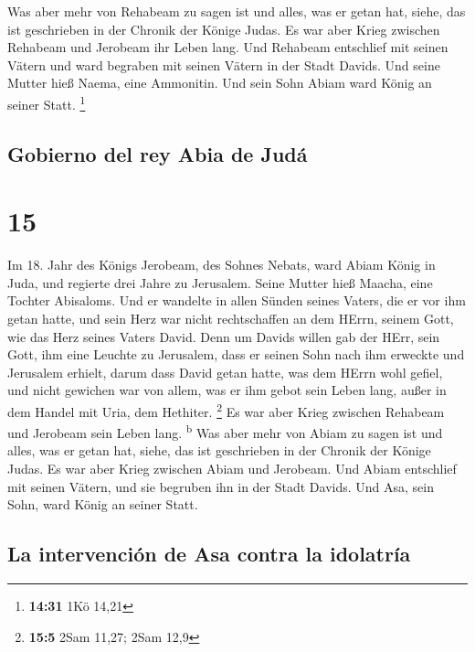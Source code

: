  Was aber mehr von Rehabeam zu sagen ist und alles, was
er getan hat, siehe, das ist geschrieben in der Chronik der Könige
Judas.  Es war aber Krieg zwischen Rehabeam und Jerobeam
ihr Leben lang.  Und Rehabeam entschlief mit seinen
Vätern und ward begraben mit seinen Vätern in der Stadt Davids. Und
seine Mutter hieß Naema, eine Ammonitin. Und sein Sohn Abiam ward König
an seiner Statt. \footnote{\textbf{14:31} 1Kö 14,21}

\hypertarget{gobierno-del-rey-abia-de-juduxe1}{%
\subsection{Gobierno del rey Abia de
Judá}\label{gobierno-del-rey-abia-de-juduxe1}}

\hypertarget{section-14}{%
\section{15}\label{section-14}}

 Im 18. Jahr des Königs Jerobeam, des Sohnes Nebats, ward
Abiam König in Juda,  und regierte drei Jahre zu
Jerusalem. Seine Mutter hieß Maacha, eine Tochter Abisaloms.
 Und er wandelte in allen Sünden seines Vaters, die er vor
ihm getan hatte, und sein Herz war nicht rechtschaffen an dem HErrn,
seinem Gott, wie das Herz seines Vaters David.  Denn um
Davids willen gab der HErr, sein Gott, ihm eine Leuchte zu Jerusalem,
dass er seinen Sohn nach ihm erweckte und Jerusalem erhielt,
 darum dass David getan hatte, was dem HErrn wohl gefiel,
und nicht gewichen war von allem, was er ihm gebot sein Leben lang,
außer in dem Handel mit Uria, dem Hethiter. \footnote{\textbf{15:5} 2Sam
  11,27; 2Sam 12,9}  Es war aber Krieg zwischen Rehabeam
und Jerobeam sein Leben lang. \textsuperscript{b}  Was
aber mehr von Abiam zu sagen ist und alles, was er getan hat, siehe, das
ist geschrieben in der Chronik der Könige Judas. Es war aber Krieg
zwischen Abiam und Jerobeam.  Und Abiam entschlief mit
seinen Vätern, und sie begruben ihn in der Stadt Davids. Und Asa, sein
Sohn, ward König an seiner Statt.

\hypertarget{la-intervenciuxf3n-de-asa-contra-la-idolatruxeda}{%
\subsection{La intervención de Asa contra la
idolatría}\label{la-intervenciuxf3n-de-asa-contra-la-idolatruxeda}}

